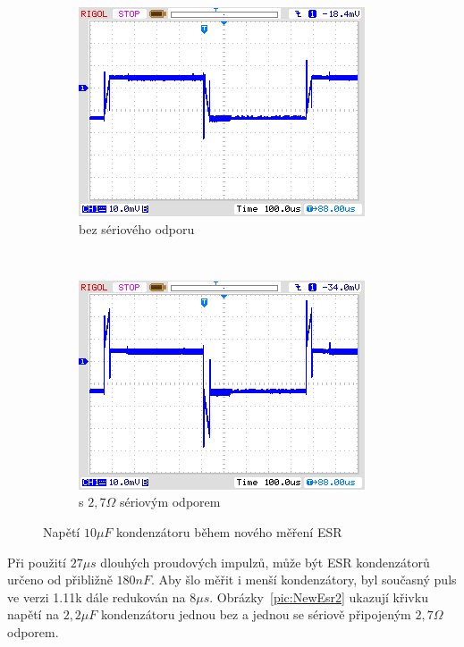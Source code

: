\begin{figure}[H]
  \begin{subfigure}[b]{.5\textwidth}
    \centering
    \includegraphics[width=1.\textwidth]{../PNG/NewEsr10uF0R0.png}
    \caption{bez sériového odporu}
  \end{subfigure}
  ~
  \begin{subfigure}[b]{.5\textwidth}
    \centering
    \includegraphics[width=1.\textwidth]{../PNG/NewEsr10uF2R7.png}
    \caption{s \(2,7\Omega\) sériovým odporem}
  \end{subfigure}
  \caption{Napětí \(10\mu F\)  kondenzátoru během nového měření ESR}
  \label{pic:NewEsr10}
\end{figure}

Při použití \(27\mu s\) dlouhých proudových impulzů, může být ESR kondenzátorů určeno od přibližně \(180nF\).
Aby šlo měřit i menší kondenzátory, byl současný puls ve verzi 1.11k dále redukován na \(8\mu s\).
Obrázky~\ref{pic:NewEsr2} ukazují křivku napětí na \(2,2\mu F\) kondenzátoru jednou bez a jednou se sériově připojeným \(2,7\Omega\) odporem.

